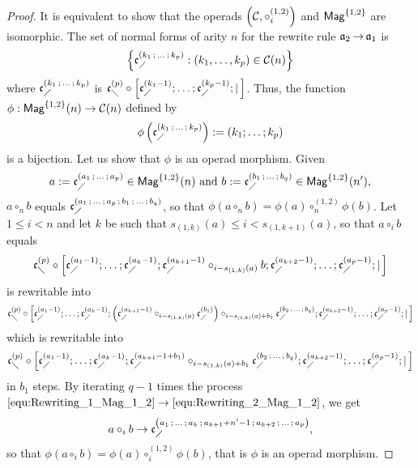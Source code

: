 \begin{proof}
  It is equivalent to show that the operads
  $\left(\mathcal{C}, \circ_i^{(1,2)}\right)$ and $\mathsf{Mag}^{\{1, 2\}}$ are
  isomorphic. The set of normal forms of arity $n$ for the rewrite rule
  $\mathfrak{a}_2 \operatorname{\to} \mathfrak{a}_1$ is
\begin{equation} \label{equ:Normal_forms_A2}
\left\{ \mathfrak{c}^{\left(k_1 \, ; \, \dots \, ; \, k_p\right)}_{\diagup} :
\left(k_1, \dots, k_p\right) \in \mathcal{C}(n) \right\}
\end{equation}
where $\mathfrak{c}^{\left(k_1 \, ; \, \dots \, ; \, k_p\right)}_{\diagup}$ is
$\mathfrak{c}^{\left(p\right)}_{\diagdown} \circ \left[\mathfrak{c}^{\left(k_1-1\right)}_{\diagup}; \dots ; \mathfrak{c}^{\left(k_p-1\right)}_{\diagup}
; | \, \right]$.
Thus, the function
$\phi : \mathsf{Mag}^{\{1, 2\}}(n) \rightarrow \mathcal{C}(n)$ defined by
\begin{equation} \label{equ:Morphism_A2}
\phi\left( \mathfrak{c}^{\left(k_1 \, ; \, \dots \, ; \, k_p\right)}_{\diagup} \right) :=
\left(k_1 ; \dots ; k_p  \right)
\end{equation}
is a bijection. Let us show that $\phi$ is an operad morphism. Given
\begin{equation}
  a := \mathfrak{c}^{\left(a_1 \, ; \, \dots \, ; \, a_p\right)}_{\diagup} \in \mathsf{Mag}^{\{1, 2\}}(n)
  \text{ and }
  b := \mathfrak{c}^{\left(b_1 \, ; \, \dots \, ; \, b_q\right)}_{\diagup} \in \mathsf{Mag}^{\{1, 2\}}(n'),
\end{equation}
$a \circ_n b$ equals $\mathfrak{c}^{\left(a_1 \, ; \, \dots \, ; \, a_p
 \, ; \, b_1 \, ; \, \dots \, ; \, b_q\right)}_{\diagup}$, so that
 $\phi\left(a \circ_n b\right) = \phi\left(a\right) \circ_n^{(1,2)}
 \phi\left(b\right)$. Let $1 \leq i < n$ and let $k$ be such that
 $s_{(1, k)}(a) \leq i < s_{(1, k+1)}(a)$, so that $a \circ_i b$ equals
\begin{equation} \label{equ:Rewriting_1_Mag_1_2}
\mathfrak{c}^{\left(p\right)}_{\diagdown} \circ \left[\mathfrak{c}^{\left(a_1-1\right)}_{\diagup}; \dots ; \mathfrak{c}^{\left(a_k-1\right)}_{\diagup};
\mathfrak{c}^{\left(a_{k+1}-1\right)}_{\diagup}
\circ_{i-s_{(1,k)}(a)} b  ; \mathfrak{c}^{\left(a_{k+2}-1\right)}_{\diagup} ; \dots; \mathfrak{c}^{\left(a_p-1\right)}_{\diagup} ;
| \, \right]
\end{equation}
is rewritable into
\begin{equation}
\mathfrak{c}^{\left(p\right)}_{\diagdown} \circ \left[\mathfrak{c}^{\left(a_1-1\right)}_{\diagup}; \dots ; \mathfrak{c}^{\left(a_k-1\right)}_{\diagup}; \left(
\mathfrak{c}^{\left(a_{k+1}-1\right)}_{\diagup} \circ_{i-s_{(1,k)}(a)}  \mathfrak{c}^{\left(b_1\right)}_{\diagup} \right)
\circ_{i-s_{(1,k)}(a)+b_1} \mathfrak{c}^{\left(b_2 \, ; \, \dots \, ; \, b_q\right)}_{\diagup} ;
\mathfrak{c}^{\left(a_{k+2}-1\right)}_{\diagup} ; \dots; \mathfrak{c}^{\left(a_p-1\right)}_{\diagup} ; | \, \right]
\end{equation}
which is rewritable into
\begin{equation} \label{equ:Rewriting_2_Mag_1_2}
\mathfrak{c}^{\left(p\right)}_{\diagdown} \circ \left[\mathfrak{c}^{\left(a_1-1\right)}_{\diagup}; \dots ; \mathfrak{c}^{\left(a_k-1\right)}_{\diagup};
\mathfrak{c}^{\left(a_{k+1}-1+b_1\right)}_{\diagup} \circ_{i-s_{(1,k)}(a)+b_1}
\mathfrak{c}^{\left(b_2 \, ; \, \dots \, ; \, b_q\right)}_{\diagup}  ; \mathfrak{c}^{\left(a_{k+2}-1\right)}_{\diagup} ; \dots;
\mathfrak{c}^{\left(a_p-1\right)}_{\diagup} ; | \, \right]
\end{equation}
 in $b_1$ steps. By iterating $q-1$ times the process
$\eqref{equ:Rewriting_1_Mag_1_2} \rightarrow
\eqref{equ:Rewriting_2_Mag_1_2}$, we get 
\begin{equation}
a \circ_i b \rightarrow \mathfrak{c}^{\left(a_1 \, ; \, \dots \, ; \, a_{k} \, ; \,
a_{k+1} + n'-1 \, ; \, a_{k+2} \, ; \, \dots \, ; \, a_p\right)}_{\diagup},
\end{equation}
so that $\phi(a \circ_i b) = \phi(a) \circ_i^{(1,2)} \phi(b)$, that is
$\phi$ is an operad morphism.
\end{proof}
\medbreak

